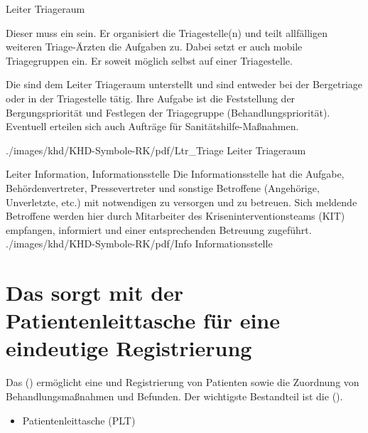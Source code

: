 \clearpage%

\TextSlideTeaser
{Leiter Triageraum}%
{%
%
%
Dieser muss ein  sein.
Er organisiert die Triagestelle(n) 
und teilt allfälligen weiteren Triage-Ärzten die Aufgaben zu.
%
Dabei setzt er auch mobile Triagegruppen ein.
%
Er  soweit möglich selbst auf einer Triagestelle.

Die  sind dem Leiter Triageraum unterstellt 
und sind entweder bei der Bergetriage 
oder in der Triagestelle tätig.
%
Ihre Aufgabe ist die Feststellung der Bergungspriorität
und Festlegen der Triagegruppe (Behandlungspriorität). 
%
Eventuell erteilen sich auch Aufträge für Sanitätshilfe-Maßnahmen.
\cite{RkRahmenvorschriftGrossunfaelle2007}
}%
{\SymbolText}%
{./images/khd/KHD-Symbole-RK/pdf/Ltr_Triage}%
{Leiter Triageraum}%
{}%
{}%
{}%


\TextSlideTeaser
{Leiter Information, Informationsstelle}%
{%
%
%
%
Die Informationsstelle hat die Aufgabe, 
Behördenvertreter,
Pressevertreter
und sonstige Betroffene (Angehörige, Unverletzte, etc.)
mit notwendigen  zu versorgen und zu betreuen. 
Sich meldende Betroffene werden hier durch Mitarbeiter des 
Kriseninterventionsteams (KIT) empfangen, 
informiert 
und einer entsprechenden Betreuung zugeführt.
\cite{RkRahmenvorschriftGrossunfaelle2007}
}%
{\SymbolText}%
{./images/khd/KHD-Symbole-RK/pdf/Info}%
{Informationsstelle}%
{}%
{}%
{}%


\clearpage 
\section{Das  sorgt mit der 
Patientenleittasche für eine eindeutige Registrierung}
\label{topic:pls}

{%
Das 
() ermöglicht eine  und Registrierung von Patienten 
sowie die  Zuordnung von Behandlungsmaßnahmen und Befunden. 
Der wichtigste
Bestandteil ist die
().}
{%
\begin{itemize}
  \item Patientenleittasche (PLT)
\end{itemize}
}

